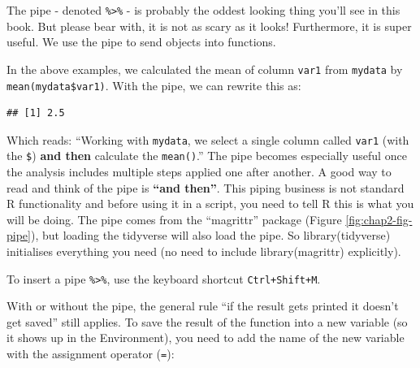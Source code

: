 \documentclass[12pt,]{krantz}
\makeatletter
\newenvironment{Shaded}{\begin{snugshade}}{\end{snugshade}}
\newcommand{\KeywordTok}[1]{\textcolor[rgb]{0.13,0.29,0.53}{\textbf{#1}}}
\newcommand{\NormalTok}[1]{#1}
\newcommand{\OperatorTok}[1]{\textcolor[rgb]{0.81,0.36,0.00}{\textbf{#1}}}
\newcommand{\StringTok}[1]{\textcolor[rgb]{0.31,0.60,0.02}{#1}}
\renewenvironment{quote}{\begin{VF}}{\end{VF}}
\newenvironment{kframe}{%
\medskip{}
\setlength{\fboxsep}{.8em}
 \def\at@end@of@kframe{}%
 \ifinner\ifhmode%
  \def\at@end@of@kframe{\end{minipage}}%
  \begin{minipage}{\columnwidth}%
 \fi\fi%
 \def\FrameCommand##1{\hskip\@totalleftmargin \hskip-\fboxsep
 \colorbox{shadecolor}{##1}\hskip-\fboxsep
     \hskip-\linewidth \hskip-\@totalleftmargin \hskip\columnwidth}%
 \MakeFramed {\advance\hsize-\width
   \@totalleftmargin\z@ \linewidth\hsize
   \@setminipage}}%
 {\par\unskip\endMakeFramed%
 \at@end@of@kframe}
\renewenvironment{Shaded}{\begin{kframe}}{\end{kframe}}
\theoremstyle{definition}
\theoremstyle{definition}
\theoremstyle{definition}
\theoremstyle{remark}
\makeatother
\begin{document}
The pipe - denoted \texttt{\%\textgreater{}\%} - is probably the oddest
looking thing you'll see in this book. But please bear with, it is not
as scary as it looks! Furthermore, it is super useful. We use the pipe
to send objects into functions.

In the above examples, we calculated the mean of column \texttt{var1}
from \texttt{mydata} by \texttt{mean(mydata\$var1)}. With the pipe, we
can rewrite this as:

\begin{Shaded}
\end{Shaded}

\begin{verbatim}
## [1] 2.5
\end{verbatim}

Which reads: ``Working with \texttt{mydata}, we select a single column
called \texttt{var1} (with the \texttt{\$}) \textbf{and then} calculate
the \texttt{mean()}.'' The pipe becomes especially useful once the
analysis includes multiple steps applied one after another. A good way
to read and think of the pipe is \textbf{``and then''}. This piping
business is not standard R functionality and before using it in a
script, you need to tell R this is what you will be doing. The pipe
comes from the ``magrittr'' package (Figure \ref{fig:chap2-fig-pipe}),
but loading the tidyverse will also load the pipe. So library(tidyverse)
initialises everything you need (no need to include library(magrittr)
explicitly).

\begin{quote}
To insert a pipe \texttt{\%\textgreater{}\%}, use the keyboard shortcut
\texttt{Ctrl+Shift+M}.
\end{quote}

With or without the pipe, the general rule ``if the result gets printed
it doesn't get saved'' still applies. To save the result of the function
into a new variable (so it shows up in the Environment), you need to add
the name of the new variable with the assignment operator (\texttt{=}):

\begin{Shaded}
\end{Shaded}
\end{document}
